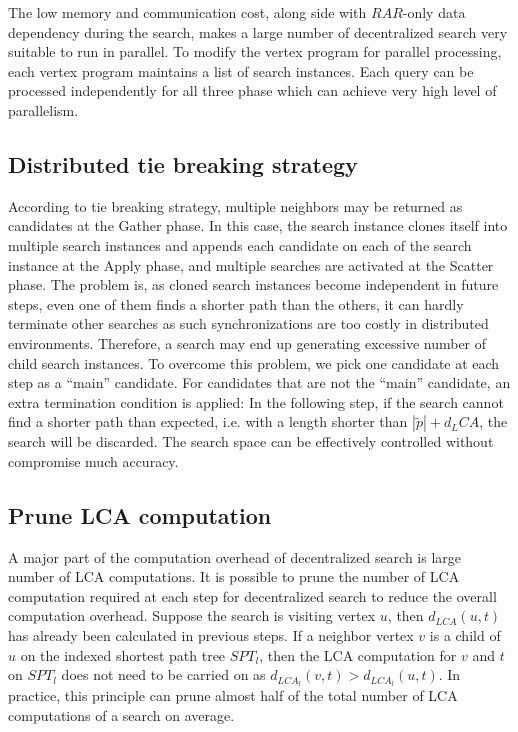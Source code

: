 The low memory and communication cost, along side with $RAR$-only data dependency during the search, makes a large number of decentralized search very suitable to run in parallel. To modify the vertex program for parallel processing, each vertex program maintains a list of search instances. Each query can be processed independently for all three phase which can achieve very high level of parallelism.

\subsection{Distributed tie breaking strategy}
According to tie breaking strategy, multiple neighbors may be returned as candidates at the Gather phase. In this case, the search instance clones itself into multiple search instances and appends each candidate on each of the search instance at the Apply phase, and multiple searches are activated at the Scatter phase. The problem is, as cloned search instances become independent in future steps, even one of them finds a shorter path than the others, it can hardly terminate other searches as such synchronizations are too costly in distributed environments. Therefore, a search may end up generating excessive number of child search instances. To overcome this problem, we pick one candidate at each step as a ``main'' candidate. For candidates that are not the ``main'' candidate, an extra termination condition is applied: In the following step, if the search cannot find a shorter path than expected, i.e. with a length shorter than $|\tilde{p}| + d_LCA$, the search will be discarded. The search space can be effectively controlled without compromise much accuracy.

\subsection{Prune LCA computation}
A major part of the computation overhead of decentralized search is large number of LCA computations. It is possible to prune the number of LCA computation required at each step for decentralized search to reduce the overall computation overhead. Suppose the search is visiting vertex $u$, then $d_{LCA}(u, t)$ has already been calculated in previous steps. If a neighbor vertex $v$ is a child of $u$ on the indexed shortest path tree $SPT_l$, then the LCA computation for $v$ and $t$ on $SPT_l$ does not need to be carried on as $d_{LCA_l}(v, t) > d_{LCA_l}(u, t)$. In practice, this principle can prune almost half of the total number of LCA computations of a search on average.

